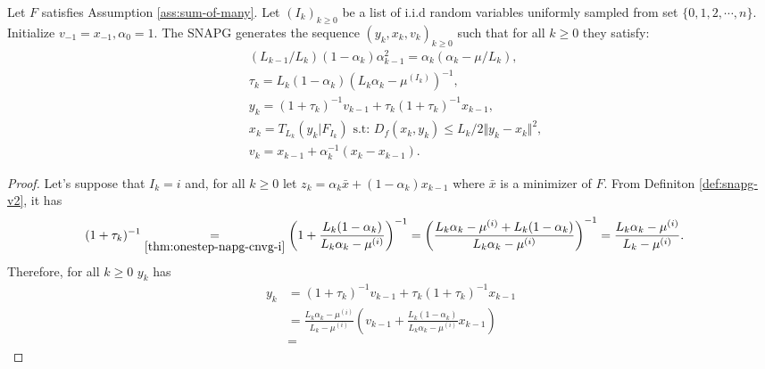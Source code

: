 \documentclass[12pt]{article}
\begin{document}
        \begin{definition}[SNAPG-V2]\label{def:snapg-v2}
            Let $F$ satisfies Assumption \ref{ass:sum-of-many}. 
            Let $(I_k)_{k \ge 0}$ be a list of i.i.d random variables uniformly sampled from set $\{0, 1, 2, \cdots, n\}$. 
            Initialize $v_{-1} = x_{-1}, \alpha_0 = 1$. 
            The SNAPG generates the sequence $(y_k, x_k, v_k)_{k \ge 0}$ such that for all $k \ge 0$ they satisfy: 
            \begin{align*}
                & (L_{k - 1}/L_k)(1 - \alpha_{k})\alpha_{k - 1}^2 = \alpha_{k}\left(\alpha_{k} - \mu/L_k\right), \\
                & \tau_k = L_k(1 - \alpha_k)\left(L_k \alpha_k - \mu^{(I_k)}\right)^{-1}, \\
                & y_k = (1 + \tau_k)^{-1}v_{k - 1} + \tau_k(1 + \tau_k)^{-1}x_{k - 1}, \\
                & x_k =  T_{L_k}(y_k | F_{I_k}) \text{ s.t: } D_f(x_k, y_k) \le L_k/2\Vert y_k - x_k\Vert^2, \\
                & v_k = x_{k - 1} + \alpha_k^{-1}(x_k - x_{k - 1}). 
            \end{align*}
        \end{definition}

        \begin{theorem}
            
        \end{theorem}
        \begin{proof}
            Let's suppose that $I_k = i$ and, for all $k \ge 0$ let $z_k = \alpha_k \bar x + (1 - \alpha_k)x_{k - 1}$ where $\bar x$ is a minimizer of $F$. 
            From Definiton \ref{def:snapg-v2}, it has
            \begin{align*}
                (1 + \tau_k)^{-1}
                &\underset{\eqref{thm:onestep-napg-cnvg-i}}{=} 
                \left(
                    1 + \frac{L_k(1 - \alpha_k)}{L_k\alpha_k - \mu^{(i)}}
                \right)^{-1} = \left(
                    \frac{L_k\alpha_k - \mu^{(i)} + L_k(1 - \alpha_k)}{L_k\alpha_k - \mu^{(i)}}
                \right)^{-1}
                = \frac{L_k\alpha_k - \mu^{(i)}}{L_k - \mu^{(i)}}. 
            \end{align*}
            Therefore, for all $k \ge 0$ $y_k$ has 
            \begin{align*}
                y_k &= (1 + \tau_k)^{-1} v_{k - 1} + \tau_k (1 + \tau_k)^{-1} x_{k - 1}
                \\
                &= \frac{L_k\alpha_k - \mu^{(i)}}{L_k - \mu^{(i)}} 
                \left(
                    v_{k - 1} + \frac{L_k(1 - \alpha_k)}{L_k\alpha_k - \mu^{(i)}} x_{k - 1}
                \right)
                \\
                &= 
            \end{align*}
        \end{proof}


    



\end{document}
